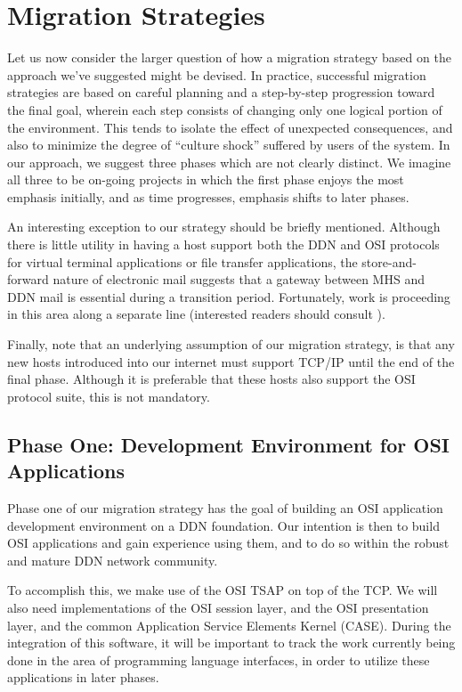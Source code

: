 
\section	{Migration Strategies}
Let us now consider the larger question of how a migration
strategy based on the approach we've suggested might be devised.
In practice,
successful migration strategies are based on careful planning and a
step-by-step progression toward the final goal,
wherein each step consists of changing only one logical portion of the
environment.
This tends to isolate the effect of unexpected consequences,
and also to minimize the degree of ``culture shock'' suffered by users of the
system.
In our approach,
we suggest three phases which are not clearly distinct.
We imagine all three to be on-going projects in which the first phase enjoys
the most emphasis initially,
and as time progresses,
emphasis shifts to later phases.

An interesting exception to our strategy should be briefly mentioned.
Although there is little utility in having a host support both the DDN and
OSI protocols for virtual terminal applications or file transfer applications,
the store-and-forward nature of electronic mail suggests that a gateway
between MHS and DDN mail is essential during a transition period.
Fortunately,
work is proceeding in this area along a separate line
(interested readers should consult \cite{ARPA.MHS}).

Finally,
note that an underlying assumption of our migration strategy,
is that any new hosts introduced into our internet must support TCP/IP
until the end of the final phase.
Although it is preferable that these hosts also support the OSI protocol suite,
this is not mandatory.

\subsection	{Phase One: Development Environment for OSI Applications}
Phase one of our migration strategy has the goal of building an OSI
application development environment on a DDN foundation.
Our intention is then to build OSI applications and gain experience using them,
and to do so within the robust and mature DDN network community.

To accomplish this,
we make use of the OSI TSAP on top of the TCP.
We will also need
implementations of the OSI session layer\cite{ISO.SP.Protocol,ISO.SP.Service},
and the OSI presentation layer\cite{ISO.PP.Syntax,ISO.PP.Encoding},
and the common Application Service Elements Kernel
(CASE)\cite{ISO.CASE.Service}.
During the integration of this software,
it will be important to track the work currently being done in the area
of programming language interfaces,
in order to utilize these applications in later phases.

